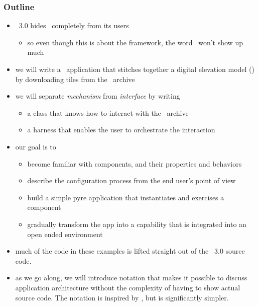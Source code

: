 %
%

\begin{frame}
%
  \frametitle{Outline}
%
  \begin{itemize}
%
  \item \isce\ 3.0 hides \pyre\ completely from its users
    \begin{itemize}
    \item so even though this is about the framework, the word \pyre\ won't show up much
    \end{itemize}
%
  \item we will write a \pyre\ application that stitches together a digital elevation model
    (\dem) by downloading tiles from the \srtm\ archive
%
  \item we will separate \emph{mechanism} from \emph{interface} by writing
    \begin{itemize}
    \item a class that knows how to interact with the \srtm\ archive
    \item a harness that enables the user to orchestrate the interaction
    \end{itemize}
%
  \item our goal is to
    \begin{itemize}
    \item become familiar with components, and their properties and behaviors
    \item describe the configuration process from the end user's point of view
    \item build a simple pyre application that instantiates and exercises a component
    \item gradually transform the app into a capability that is integrated into an open ended
      environment
    \end{itemize}
%
  \item much of the code in these examples is lifted straight out of the \isce\ 3.0 source
    code.
%
  \item as we go along, we will introduce notation that makes it possible to discuss
    application architecture without the complexity of having to show actual source code. The
    notation is inspired by \uml\supercite{uml-99,uml-05}, but is significantly simpler.
%
  \end{itemize}
%
\end{frame}

